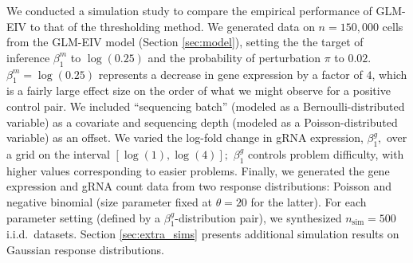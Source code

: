 \documentclass[12pt]{article}
\begin{document}
We conducted a simulation study to compare the empirical performance of GLM-EIV to that of the thresholding method. We generated data on $n = 150,000$ cells from the GLM-EIV model (Section \ref{sec:model}), setting the the target of inference $\beta^m_1$ to $\log(0.25)$ and the probability of perturbation $\pi$ to $0.02$. $\beta^m_1 = \log(0.25)$ represents a decrease in gene expression by a factor of $4$, which is a fairly large effect size on the order of what we might observe for a positive control pair. We included ``sequencing batch'' (modeled as a Bernoulli-distributed variable) as a covariate and sequencing depth (modeled as a Poisson-distributed variable) as an offset. We varied the log-fold change in gRNA expression, $\beta^g_1,$ over a grid on the interval $[\log(1), \log(4)];$ $\beta^g_1$ controls problem difficulty, with higher values corresponding to easier problems. Finally, we generated the gene expression and gRNA count data from two response distributions: Poisson and negative binomial (size parameter fixed at $\theta = 20$ for the latter). For each parameter setting (defined by a $\beta^g_1$-distribution pair), we synthesized $n_\textrm{sim} = 500$ i.i.d.\ datasets. Section \ref{sec:extra_sims} presents additional simulation results on Gaussian response distributions.
\end{document}
